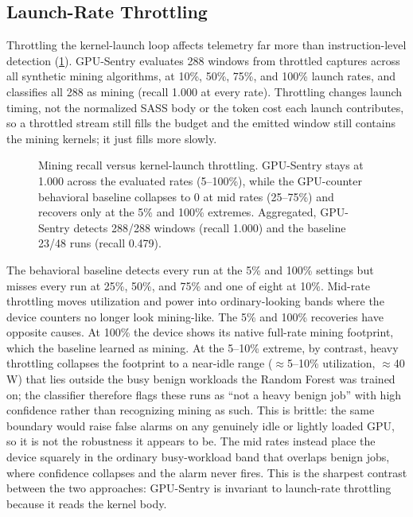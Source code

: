 \subsection{Launch-Rate Throttling}

Throttling the kernel-launch loop affects telemetry far more than instruction-level detection (\cref{fig:throttle}). GPU-Sentry evaluates 288 windows from throttled captures across all synthetic mining algorithms, at 10\%, 50\%, 75\%, and 100\% launch rates, and classifies all 288 as mining (recall 1.000 at every rate). Throttling changes launch timing, not the normalized SASS body or the token cost each launch contributes, so a throttled stream still fills the budget and the emitted window still contains the mining kernels; it just fills more slowly.

\begin{figure}[t]
    \centering
    
    \caption{Mining recall versus kernel-launch throttling. GPU-Sentry stays at 1.000 across the evaluated rates (5--100\%), while the GPU-counter behavioral baseline collapses to 0 at mid rates (25--75\%) and recovers only at the 5\% and 100\% extremes. Aggregated, GPU-Sentry detects 288/288 windows (recall 1.000) and the baseline 23/48 runs (recall 0.479).}
    \label{fig:throttle}
\end{figure}

The behavioral baseline detects every run at the 5\% and 100\% settings but misses every run at 25\%, 50\%, and 75\% and one of eight at 10\%. Mid-rate throttling moves utilization and power into ordinary-looking bands where the device counters no longer look mining-like. The 5\% and 100\% recoveries have opposite causes. At 100\% the device shows its native full-rate mining footprint, which the baseline learned as mining. At the 5--10\% extreme, by contrast, heavy throttling collapses the footprint to a near-idle range ($\approx$5--10\% utilization, $\approx$40\,W) that lies outside the busy benign workloads the Random Forest was trained on; the classifier therefore flags these runs as ``not a heavy benign job'' with high confidence rather than recognizing mining as such. This is brittle: the same boundary would raise false alarms on any genuinely idle or lightly loaded GPU, so it is not the robustness it appears to be. The mid rates instead place the device squarely in the ordinary busy-workload band that overlaps benign jobs, where confidence collapses and the alarm never fires. This is the sharpest contrast between the two approaches: GPU-Sentry is invariant to launch-rate throttling because it reads the kernel body.


